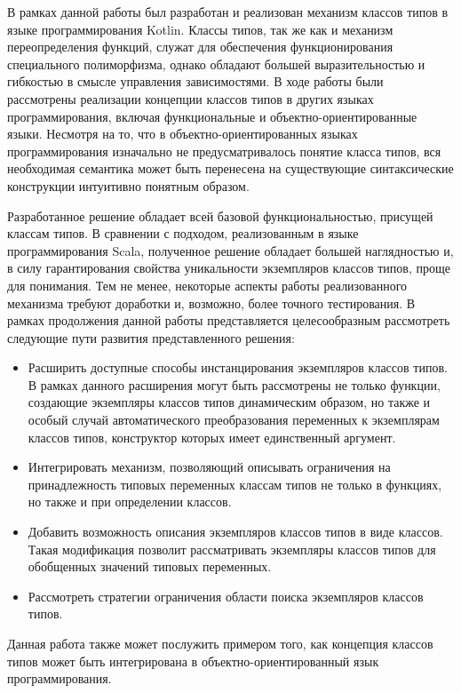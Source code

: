 \conclusion

В рамках данной работы был разработан и реализован механизм классов типов в языке программирования Kotlin. Классы типов, так же как и механизм переопределения функций, служат для обеспечения функционирования специального полиморфизма, однако обладают большей выразительностью и гибкостью в смысле управления зависимостями. В ходе работы были рассмотрены реализации концепции классов типов в других языках программирования, включая функциональные и объектно-ориентированные языки. Несмотря на то, что в объектно-ориентированных языках программирования изначально не предусматривалось понятие класса типов, вся необходимая семантика может быть перенесена на существующие синтаксические конструкции интуитивно понятным образом. 

Разработанное решение обладает всей базовой функциональностью, присущей классам типов. В сравнении с подходом, реализованным в языке программирования Scala, полученное решение обладает большей наглядностью и, в силу гарантирования свойства уникальности экземпляров классов типов, проще для понимания. Тем не менее, некоторые аспекты работы реализованного механизма требуют доработки и, возможно, более точного тестирования. В рамках продолжения данной работы представляется целесообразным рассмотреть следующие пути развития представленного решения:
\begin{itemize}
    \item Расширить доступные способы инстанцирования экземпляров классов типов. В рамках данного расширения могут быть рассмотрены не только функции, создающие экземпляры классов типов динамическим образом, но также и особый случай автоматического преобразования переменных к экземплярам классов типов, конструктор которых имеет единственный аргумент.  
    \item Интегрировать механизм, позволяющий описывать ограничения на принадлежность типовых переменных классам типов не только в функциях, но также и при определении классов. 
    \item Добавить возможность описания экземпляров классов типов в виде классов. Такая модификация позволит рассматривать экземпляры классов типов для обобщенных значений типовых переменных. 
    \item Рассмотреть стратегии ограничения области поиска экземпляров классов типов. 
\end{itemize}
Данная работа также может послужить примером того, как концепция классов типов  может быть интегрирована в объектно-ориентированный язык программирования. 
